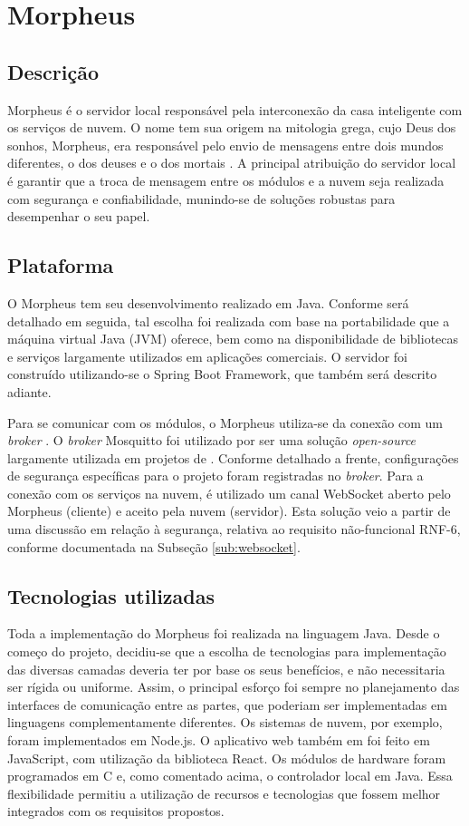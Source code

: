 \section{Morpheus \label{chap:morpheus}}

\subsection{Descrição}
Morpheus é o servidor local responsável pela interconexão da casa inteligente com os serviços de nuvem. O nome tem sua origem na mitologia grega, cujo Deus dos sonhos, Morpheus, era responsável pelo envio de mensagens entre dois mundos diferentes, o dos deuses e o dos mortais \cite{morpheusName}. A principal atribuição do servidor local é garantir que a troca de mensagem entre os módulos e a nuvem seja realizada com segurança e confiabilidade, munindo-se de soluções robustas para desempenhar o seu papel.

\subsection{Plataforma}
O Morpheus tem seu desenvolvimento realizado em Java. Conforme será detalhado em seguida, tal escolha foi realizada com base na portabilidade que a máquina virtual Java (JVM) oferece, bem como na disponibilidade de bibliotecas e serviços largamente utilizados em aplicações comerciais. O servidor foi construído utilizando-se o Spring Boot Framework, que também será descrito adiante.

Para se comunicar com os módulos, o Morpheus utiliza-se da conexão com um \emph{broker} \wmqtt{}. O \emph{broker} Mosquitto foi utilizado por ser uma solução \emph{open-source} largamente utilizada em projetos de \wiot. Conforme detalhado a frente, configurações de segurança específicas para o projeto foram registradas no \emph{broker}. Para a conexão com os serviços na nuvem, é utilizado um canal WebSocket aberto pelo Morpheus (cliente) e aceito pela nuvem (servidor). Esta solução veio a partir de uma discussão em relação à segurança, relativa ao requisito não-funcional RNF-6, conforme documentada na Subseção \ref{sub:websocket}.

\subsection{Tecnologias utilizadas}
Toda a implementação do Morpheus foi realizada na linguagem Java. Desde o começo do projeto, decidiu-se que a escolha de tecnologias para implementação das diversas camadas deveria ter por base os seus benefícios, e não necessitaria ser rígida ou uniforme. Assim, o principal esforço foi sempre no planejamento das interfaces de comunicação entre as partes, que poderiam ser implementadas em linguagens complementamente diferentes. Os sistemas de nuvem, por exemplo, foram implementados em Node.js. O aplicativo web também em foi feito em JavaScript, com utilização da biblioteca React. Os módulos de hardware foram programados em C e, como comentado acima, o controlador local em Java. Essa flexibilidade permitiu a utilização de recursos e tecnologias que fossem melhor integrados com os requisitos propostos.

